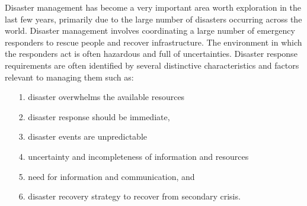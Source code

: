 Disaster management has become a very important area worth exploration in the last few years, primarily due to the large number of disasters occurring across the world. Disaster management involves coordinating a large number of emergency responders to rescue people and recover infrastructure. The environment in which the responders act is often hazardous and full of uncertainties. Disaster response requirements are often identified by several distinctive characteristics and factors relevant to managing them \cite{MASDIsaster} such as: 
\begin{enumerate}
\setlength{\itemsep}{1.5pt}
\setlength{\parskip}{1.5pt}
\item[1.]disaster overwhelms the available resources 
\item[2.]disaster response should be immediate,
\item[3.]disaster events are unpredictable
\item[4.]uncertainty and incompleteness of information and resources
\item[5.]need for information and communication, and
\item[6.]disaster recovery strategy to recover from secondary crisis. 
\end{enumerate}\par

